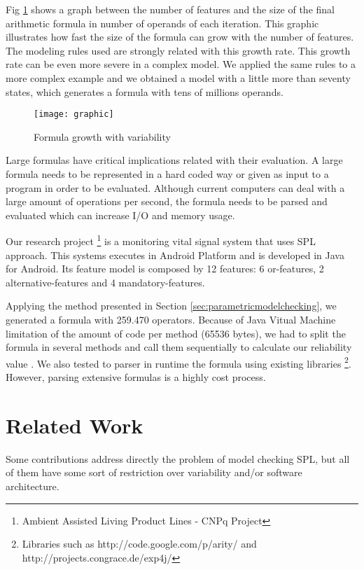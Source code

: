 \documentclass[conference]{IEEEtran}
\begin{document}
	Fig \ref{fig:graphic} shows a graph between the number of features and 
	the size of the final arithmetic formula in number of operands of each
	iteration. This graphic illustrates how fast the size of the formula
	can grow with the number of features. The modeling rules
	used are strongly related with this growth rate. This growth rate can
	be even more severe in a complex model.  We applied the same rules
	to a more complex example and we obtained a model with a little more than seventy 
	states, which generates a formula with tens of millions operands.
	
	\begin{figure}[!h]
	\centering
	\texttt{[image: graphic]}	
	\caption{Formula growth with variability}
	\label{fig:graphic}
	\end{figure}
	
	
  Large formulas have critical implications related with their evaluation. 
  A large formula needs to be represented in a hard coded way
  or given as input to a program in order to be evaluated. Although current computers can deal with a
  large amount of operations per second, the formula needs to be parsed and evaluated which
  can increase I/O and memory usage.

  Our research project \footnote{Ambient Assisted Living Product Lines - CNPq Project} is
  a monitoring vital signal system that uses SPL approach. This systems executes in Android Platform 
  and is developed in Java for Android. Its feature model is composed by 12 features: 6 or-features,
  2 alternative-features and 4 mandatory-features.

  Applying the method presented in Section \ref{sec:parametricmodelchecking}, 
  we generated a formula with 259.470 operators. Because of Java Vitual Machine limitation of the amount 
  of code per method (65536 bytes), 
  we had to split the formula in several methods and call them sequentially to calculate our reliability value
  \cite{java}. 
  We also tested to parser in runtime the formula using existing libraries
  \footnote{Libraries such as http://code.google.com/p/arity/ and http://projects.congrace.de/exp4j/}. 
  However, parsing extensive formulas is a highly cost process.
	
	
\section{Related Work}
\label{sec:relatedwork}	

	Some contributions address directly the problem of model checking SPL, but all of them
	have some sort of restriction over variability and/or software architecture. 
	
\end{document}
